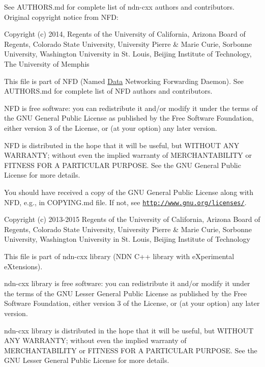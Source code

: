 See A\+U\+T\+H\+O\+R\+S.\+md for complete list of ndn-\/cxx authors and contributors. Original copyright notice from N\+FD\+:

Copyright (c) 2014, Regents of the University of California, Arizona Board of Regents, Colorado State University, University Pierre \& Marie Curie, Sorbonne University, Washington University in St. Louis, Beijing Institute of Technology, The University of Memphis

This file is part of N\+FD (Named \hyperlink{classndn_1_1Data}{Data} Networking Forwarding Daemon). See A\+U\+T\+H\+O\+R\+S.\+md for complete list of N\+FD authors and contributors.

N\+FD is free software\+: you can redistribute it and/or modify it under the terms of the G\+NU General Public License as published by the Free Software Foundation, either version 3 of the License, or (at your option) any later version.

N\+FD is distributed in the hope that it will be useful, but W\+I\+T\+H\+O\+UT A\+NY W\+A\+R\+R\+A\+N\+TY; without even the implied warranty of M\+E\+R\+C\+H\+A\+N\+T\+A\+B\+I\+L\+I\+TY or F\+I\+T\+N\+E\+SS F\+OR A P\+A\+R\+T\+I\+C\+U\+L\+AR P\+U\+R\+P\+O\+SE. See the G\+NU General Public License for more details.

You should have received a copy of the G\+NU General Public License along with N\+FD, e.\+g., in C\+O\+P\+Y\+I\+N\+G.\+md file. If not, see \href{http://www.gnu.org/licenses/}{\tt http\+://www.\+gnu.\+org/licenses/}.

Copyright (c) 2013-\/2015 Regents of the University of California, Arizona Board of Regents, Colorado State University, University Pierre \& Marie Curie, Sorbonne University, Washington University in St. Louis, Beijing Institute of Technology

This file is part of ndn-\/cxx library (N\+DN C++ library with e\+Xperimental e\+Xtensions).

ndn-\/cxx library is free software\+: you can redistribute it and/or modify it under the terms of the G\+NU Lesser General Public License as published by the Free Software Foundation, either version 3 of the License, or (at your option) any later version.

ndn-\/cxx library is distributed in the hope that it will be useful, but W\+I\+T\+H\+O\+UT A\+NY W\+A\+R\+R\+A\+N\+TY; without even the implied warranty of M\+E\+R\+C\+H\+A\+N\+T\+A\+B\+I\+L\+I\+TY or F\+I\+T\+N\+E\+SS F\+OR A P\+A\+R\+T\+I\+C\+U\+L\+AR P\+U\+R\+P\+O\+SE. See the G\+NU Lesser General Public License for more details.

